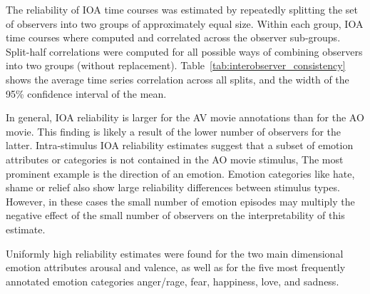\documentclass[10pt,a4paper,twocolumn]{article}
\begin{document}
The reliability of IOA time courses was estimated by repeatedly splitting the
set of observers into two groups of approximately equal size. Within each
group, IOA time courses where computed and correlated across the observer
sub-groups. Split-half correlations were computed for all possible ways of
combining observers into two groups (without replacement).
Table~\ref{tab:interobserver_consistency} shows the average time series
correlation across all splits, and the width of the 95\% confidence interval of
the mean.

In general, IOA reliability is larger for the AV movie annotations than for the
AO movie. This finding is likely a result of the lower number of observers for
the latter. Intra-stimulus IOA reliability estimates suggest that a subset of
emotion attributes or categories is not contained in the AO movie stimulus,
The most prominent example is the direction of an emotion. Emotion categories
like hate, shame or relief also show large reliability differences between
stimulus types.  However, in these cases the small number of emotion episodes
may multiply the negative effect of the small number of observers on the
interpretability of this estimate.

Uniformly high reliability estimates were found for the two main dimensional
emotion attributes arousal and valence, as well as for the five most frequently
annotated emotion categories anger/rage, fear, happiness, love, and sadness.
\end{document}
